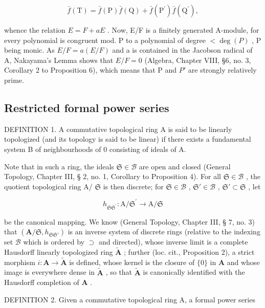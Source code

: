 \[
\bar {f} (\mathrm{T}) = \bar {f} (\mathrm{P}) \bar {f} (\mathrm{Q}) + \bar {f} (\mathrm{P} ^ {\prime}) \bar {f} (\mathrm{Q} ^ {\prime}),
\]

whence the relation \(E = F + aE\) . Now, E/F is a finitely generated A-module, for every polynomial is congruent mod. P to a polynomial of degree \(<\deg(P)\) , P being monic. As \(E/F = a(E/F)\) and a is contained in the Jacobson radical of A, Nakayama's Lemma shows that \(E/F = 0\) (Algebra, Chapter VIII, §6, no. 3, Corollary 2 to Proposition 6), which means that P and \(P'\) are strongly relatively prime.

\subsection{Restricted formal power series}

DEFINITION 1. A commutative topological ring A is said to be linearly topologized (and its topology is said to be linear) if there exists a fundamental system B of neighbourhoods of 0 consisting of ideals of A.

Note that in such a ring, the ideals \(\mathfrak{S} \in \mathcal{B}\) are open and closed (General Topology, Chapter III, § 2, no. 1, Corollary to Proposition 4). For all \(\mathfrak{S} \in \mathcal{B}\) , the quotient topological ring A/ \(\mathfrak{S}\) is then discrete; for \(\mathfrak{S} \in \mathcal{B}\) , \(\mathfrak{S}' \in \mathcal{B}\) , \(\mathfrak{S}' \subset \mathfrak{S}\) , let

\[
h _ {\mathfrak {S S} ^ {\prime}} \colon \mathrm{A} / \mathfrak {S} ^ {\prime} \rightarrow \mathrm{A} / \mathfrak {S}
\]

be the canonical mapping. We know (General Topology, Chapter III, § 7, no. 3) that \((\mathbf{A} / \mathfrak{S}, h_{\mathfrak{S}\mathfrak{S}'})\) is an inverse system of discrete rings (relative to the indexing set \(\mathcal{B}\) which is ordered by \(\supset\) and directed), whose inverse limit is a complete Hausdorff linearly topologized ring \(\tilde{\mathbf{A}}\) ; further (loc. cit., Proposition 2), a strict morphism \(i: \mathbf{A} \to \tilde{\mathbf{A}}\) is defined, whose kernel is the closure of \(\{0\}\) in \(\mathbf{A}\) and whose image is everywhere dense in \(\tilde{\mathbf{A}}\) , so that \(\tilde{\mathbf{A}}\) is canonically identified with the Hausdorff completion of \(\mathbf{A}\) .

DEFINITION 2. Given a commutative topological ring A, a formal power series

